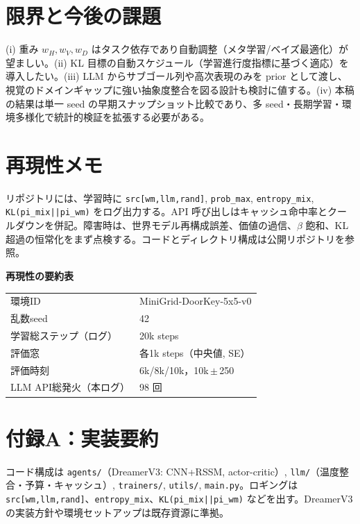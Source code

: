 \documentclass[a4paper,12pt]{article}
\begin{document}
\section{限界と今後の課題}
(i) 重み $w_H,w_V,w_D$ はタスク依存であり自動調整（メタ学習/ベイズ最適化）が望ましい。(ii) KL 目標の自動スケジュール（学習進行度指標に基づく適応）を導入したい。(iii) LLM からサブゴール列や高次表現のみを prior として渡し、視覚のドメインギャップに強い抽象度整合を図る設計も検討に値する。(iv) 本稿の結果は単一 seed の早期スナップショット比較であり、多 seed・長期学習・環境多様化で統計的検証を拡張する必要がある\citep{hafner2023dreamerv3}。

\section{再現性メモ}
リポジトリには、学習時に \texttt{src[wm,llm,rand]}, \texttt{prob\_max}, \texttt{entropy\_mix}, \texttt{KL(pi\_mix||pi\_wm)} をログ出力する。API 呼び出しはキャッシュ命中率とクールダウンを併記。障害時は、世界モデル再構成誤差、価値の過信、$\beta$ 飽和、KL 超過の恒常化をまず点検する。コードとディレクトリ構成は公開リポジトリを参照\citep{lore_github}。

\noindent\textbf{再現性の要約表}
\begin{center}
\begin{tabular}{ll}
環境ID & MiniGrid-DoorKey-5x5-v0 \\
乱数seed & 42 \\
学習総ステップ（ログ） & 20k steps \\
評価窓 & 各1k steps（中央値, SE） \\
評価時刻 & 6k/8k/10k，10k\,$\pm$\,250 \\
LLM API総発火（本ログ） & 98 回 \\
\end{tabular}
\end{center}

\section*{付録A：実装要約}
コード構成は \texttt{agents/}（DreamerV3: CNN+RSSM, actor-critic）, \texttt{llm/}（温度整合・予算・キャッシュ）, \texttt{trainers/}, \texttt{utils/}, \texttt{main.py}。ロギングは \texttt{src[wm,llm,rand]}、\texttt{entropy\_mix}、\texttt{KL(pi\_mix||pi\_wm)} などを出す。DreamerV3 の実装方針や環境セットアップは既存資源に準拠\citep{dreamerv3_github}。
\end{document}

